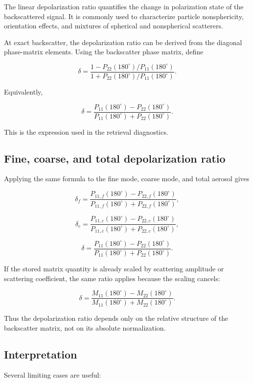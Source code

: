 \documentclass[
  letterpaper,
]{scrbook}
\begin{document}
The linear depolarization ratio quantifies the change in polarization
state of the backscattered signal. It is commonly used to characterize
particle nonsphericity, orientation effects, and mixtures of spherical
and nonspherical scatterers.

At exact backscatter, the depolarization ratio can be derived from the
diagonal phase-matrix elements. Using the backscatter phase matrix,
define

\[
\delta = \frac{1 - P_{22}(180^\circ)/P_{11}(180^\circ)}
{1 + P_{22}(180^\circ)/P_{11}(180^\circ)}.
\]

Equivalently,

\[
\delta = \frac{P_{11}(180^\circ)-P_{22}(180^\circ)}
{P_{11}(180^\circ)+P_{22}(180^\circ)}.
\]

This is the expression used in the retrieval diagnostics.

\subsection{Fine, coarse, and total depolarization
ratio}\label{fine-coarse-and-total-depolarization-ratio}

Applying the same formula to the fine mode, coarse mode, and total
aerosol gives

\[
\delta_f =
\frac{P_{11,f}(180^\circ)-P_{22,f}(180^\circ)}
{P_{11,f}(180^\circ)+P_{22,f}(180^\circ)},
\]

\[
\delta_c =
\frac{P_{11,c}(180^\circ)-P_{22,c}(180^\circ)}
{P_{11,c}(180^\circ)+P_{22,c}(180^\circ)},
\]

\[
\delta =
\frac{P_{11}(180^\circ)-P_{22}(180^\circ)}
{P_{11}(180^\circ)+P_{22}(180^\circ)}.
\]

If the stored matrix quantity is already scaled by scattering amplitude
or scattering coefficient, the same ratio applies because the scaling
cancels:

\[
\delta =
\frac{M_{11}(180^\circ)-M_{22}(180^\circ)}
{M_{11}(180^\circ)+M_{22}(180^\circ)}.
\]

Thus the depolarization ratio depends only on the relative structure of
the backscatter matrix, not on its absolute normalization.

\subsection{Interpretation}\label{interpretation-1}

Several limiting cases are useful:
\end{document}
